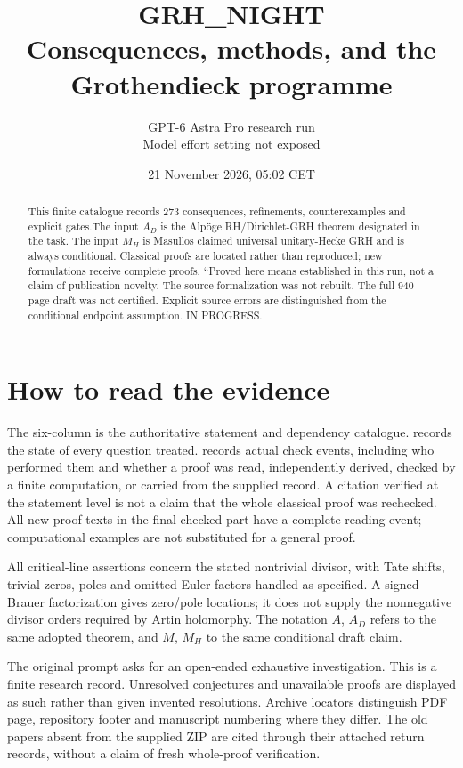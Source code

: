 \documentclass[11pt,a4paper]{article}
\title{\textbf{GRH\_NIGHT}\\Consequences, methods, and the Grothendieck programme}
\author{GPT-6 Astra Pro research run\\Model effort setting not exposed}
\date{21 November 2026, 05:\allowbreak{}02 CET}
\begin{document}
\maketitle
\begin{abstract}
This finite catalogue records 273 consequences, refinements, counterexamples and explicit gates.\allowbreak{}The input $A_D$ is the Alp\"oge RH/Dirichlet-GRH theorem designated in the task. The input $M_H$ is Masullo\textquotesingle s claimed universal unitary-Hecke GRH and is always conditional. Classical proofs are located rather than reproduced; new formulations receive complete proofs. ``Proved here means established in this run, not a claim of publication novelty. The source formalization was not rebuilt. The full 940-page draft was not certified. Explicit source errors are distinguished from the conditional endpoint assumption. IN PROGRESS.
\end{abstract}
\tableofcontents
\newpage
\section*{How to read the evidence}
The six-column  is the authoritative statement and
dependency catalogue.  records the state of every
question treated.  records actual check events,
including who performed them and whether a proof was read, independently
derived, checked by a finite computation, or carried from the supplied
record. A citation verified at the statement level is not a claim that the
whole classical proof was rechecked. All new proof texts in the final
checked part have a complete-reading event; computational examples are
not substituted for a general proof.

All critical-line assertions concern the stated nontrivial divisor, with
Tate shifts, trivial zeros, poles and omitted Euler factors handled as
specified. A signed Brauer factorization gives zero/pole locations; it
does not supply the nonnegative divisor orders required by Artin
holomorphy. The notation $A$, $A_D$ refers to the same adopted theorem,
and $M$, $M_H$ to the same conditional draft claim.

The original prompt asks for an open-ended exhaustive investigation.
This is a finite research record. Unresolved conjectures and unavailable
proofs are displayed as such rather than given invented resolutions.
Archive locators distinguish PDF page, repository footer and manuscript
numbering where they differ. The old papers absent from the supplied ZIP
are cited through their attached return records, without a claim of fresh
whole-proof verification.
\end{document}
